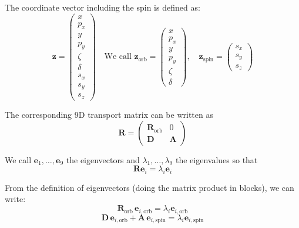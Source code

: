 The coordinate vector including the spin is defined as:
\begin{equation}
\bm{z} = 
\begin{pmatrix}
x \\
p_x \\
y \\
p_y \\
\zeta \\
\delta \\
s_x \\
s_y \\
s_z
\end{pmatrix}
\quad \text{We call } 
\bm{z}_{\text{orb}} = 
\begin{pmatrix}
x \\
p_x \\
y \\
p_y \\
\zeta \\
\delta
\end{pmatrix},
\quad
\bm{z}_{\text{spin}} = 
\begin{pmatrix}
s_x \\
s_y \\
s_z
\end{pmatrix}
\end{equation}

The corresponding 9D transport matrix can be written as
\begin{equation}
\mathbf{R} = 
\begin{pmatrix}
\mathbf{R}_{\text{orb}} & 0 \\
\mathbf{D} & \mathbf{A}
\end{pmatrix}
\end{equation}

We call $\bm{e}_1, \ldots, \bm{e}_9$ the eigenvectors and $\lambda_1, \ldots, \lambda_9$ the eigenvalues so that
\begin{equation}
\mathbf{R} \bm{e}_i = \lambda_i \bm{e}_i
\end{equation}

From the definition of eigenvectors (doing the matrix product in blocks), we can write:
\begin{equation}
\mathbf{R}_{\text{orb}} \, \bm{e}_{i, \text{orb}} = \lambda_i \bm{e}_{i, \text{orb}}
\label{eq:eispin_from_eiorb}
\end{equation}
\begin{equation}
\mathbf{D} \, \bm{e}_{i, \text{orb}} + \mathbf{A} \, \bm{e}_{i, \text{spin}} = \lambda_i \bm{e}_{i, \text{spin}}
\end{equation}

